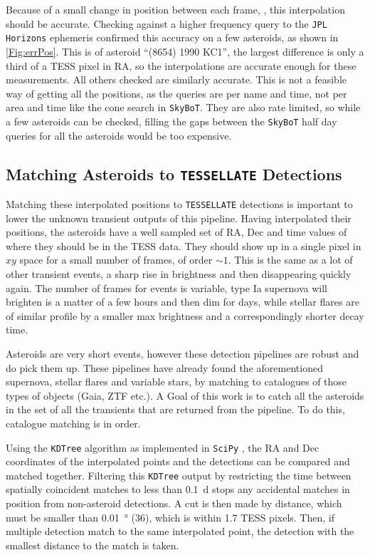 \documentclass{UCreport}
\begin{document}
Because of a small change in position between each frame, \citep[$\sim \qty{1}{\px}$ per \qty{30}{min} frame][]{Pal2018}, this interpolation should be accurate.
Checking against a higher frequency query to the \texttt{JPL Horizons} ephemeris  confirmed this accuracy on a few asteroids, as shown in \autoref{Fig:errPos}.
This is of asteroid ``(8654) 1990 KC1'', the largest difference is only a third of a TESS pixel in RA, so the interpolations are accurate enough for these measurements. 
All others checked are similarly accurate.
This is not a feasible way of getting all the positions, as the queries are per name and time, not per area and time like the cone search in \texttt{SkyBoT}.
They are also rate limited, so while a few asteroids can be checked, filling the gaps between the \texttt{SkyBoT} half day queries for all the asteroids would be too expensive.



\subsection{Matching Asteroids to \texttt{TESSELLATE} Detections}\label{SubSec:Match}

Matching these interpolated positions to \texttt{TESSELLATE} detections is important to lower the unknown transient outputs of this pipeline.
Having interpolated their positions, the asteroids have a well sampled set of RA, Dec and time values of where they should be in the TESS data.
They should show up in a single pixel in $xy$ space for a small number of frames, of order $\sim1$.
This is the same as a lot of other transient events, a sharp rise in brightness and then disappearing quickly again.
The number of frames for events is variable, type Ia supernova will brighten is a matter of a few hours and then dim for days, while stellar flares are of similar profile by a smaller max brightness and a correspondingly shorter decay time.

Asteroids are very short events, however these detection pipelines are robust and do pick them up.
These pipelines have already found the aforementioned supernova, stellar flares and variable stars, by matching to catalogues of those types of objects (Gaia, ZTF etc.). %
A Goal of this work is to catch all the asteroids in the set of all the transients that are returned from the pipeline.
To do this, catalogue matching is in order.


Using the \texttt{KDTree} algorithm \citep{Maneewongvatana1999} as implemented in \texttt{SciPy} \citep{2020SciPy-NMeth}, the RA and Dec coordinates of the interpolated points and the detections can be compared and matched together.
Filtering this \texttt{KDTree} output by restricting the time between spatially coincident matches to less than \qty{0.1}{\day} stops any accidental matches in position from non-asteroid detections.
A cut is then made by distance, which must be smaller than \qty{0.01}{\degree} (\qty{36}{\arcsec}), which is within 1.7 TESS pixels.
Then, if multiple detection match to the same interpolated point, the detection with the smallest distance to the match is taken.
\end{document}
